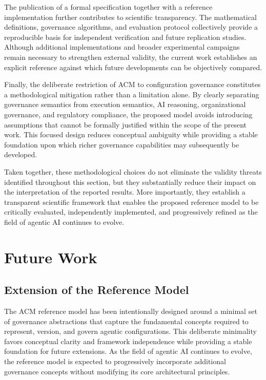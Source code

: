\documentclass[10pt]{article}
\begin{document}
The publication of a formal specification together with a reference implementation further contributes to scientific transparency. The mathematical definitions, governance algorithms, and evaluation protocol collectively provide a reproducible basis for independent verification and future replication studies. Although additional implementations and broader experimental campaigns remain necessary to strengthen external validity, the current work establishes an explicit reference against which future developments can be objectively compared.

Finally, the deliberate restriction of ACM to configuration governance constitutes a methodological mitigation rather than a limitation alone. By clearly separating governance semantics from execution semantics, AI reasoning, organizational governance, and regulatory compliance, the proposed model avoids introducing assumptions that cannot be formally justified within the scope of the present work. This focused design reduces conceptual ambiguity while providing a stable foundation upon which richer governance capabilities may subsequently be developed.

Taken together, these methodological choices do not eliminate the validity threats identified throughout this section, but they substantially reduce their impact on the interpretation of the reported results. More importantly, they establish a transparent scientific framework that enables the proposed reference model to be critically evaluated, independently implemented, and progressively refined as the field of agentic AI continues to evolve.

\section{Future Work}
\label{sec:future_work}

\subsection{Extension of the Reference Model}

The ACM reference model has been intentionally designed around a minimal set of governance abstractions that capture the fundamental concepts required to represent, version, and govern agentic configurations. This deliberate minimality favors conceptual clarity and framework independence while providing a stable foundation for future extensions. As the field of agentic AI continues to evolve, the reference model is expected to progressively incorporate additional governance concepts without modifying its core architectural principles.
\end{document}
